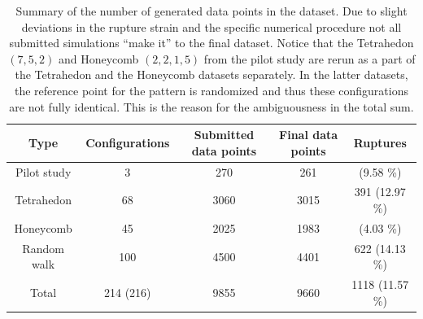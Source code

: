 \begin{table}[H]
  \begin{center}
  \caption{Summary of the number of generated data points in the dataset. Due to slight deviations in the rupture strain and the specific numerical procedure not all submitted simulations ``make it'' to the final dataset. Notice that the Tetrahedon $(7, 5, 2)$ and Honeycomb $(2, 2, 1, 5)$ from the pilot study are rerun as a part of the Tetrahedon and the Honeycomb datasets separately. In the latter datasets, the reference point for the pattern is randomized and thus these configurations are not fully identical. This is the reason for the ambiguousness in the total sum.}
  \label{tab:dataset_summary}
  \begin{tabular}{ | c | c | c | c | c |} \hline
  \textbf{Type} & \textbf{Configurations} & \textbf{Submitted data points} & \textbf{Final data points} & \textbf{Ruptures} \\ \hline
  Pilot study & 3 & 270 & 261 & \: 25 \: (9.58 \%)\\ \hline
  Tetrahedon & 68 & 3060 & 3015 & 391 (12.97 \%)\\ \hline
  Honeycomb & 45 & 2025 & 1983 & \: 80 \: (4.03 \%)\\ \hline
  Random walk & 100 & 4500 & 4401 & 622 (14.13 \%) \\ \Xhline{2\arrayrulewidth}
  Total & 214 (216) & 9855 & 9660 & 1118 (11.57 \%) \\ \hline
  \end{tabular}
  \end{center}
\end{table}


